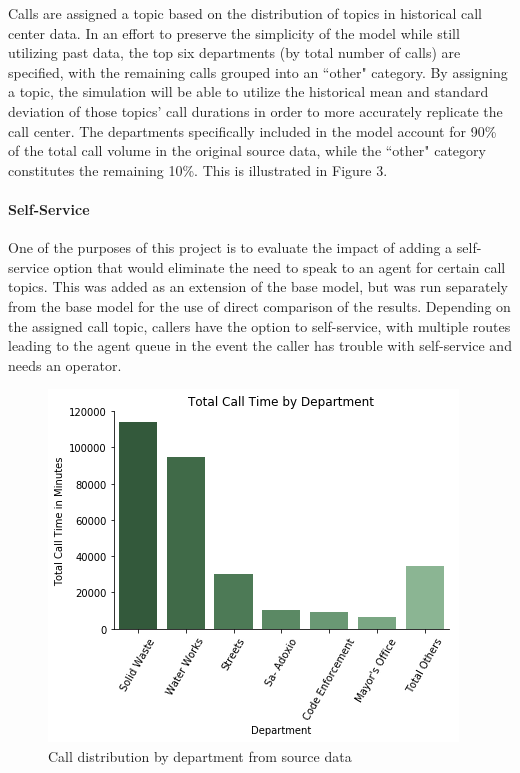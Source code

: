 \documentclass[12pt,twocolumn]{article}
\begin{document}
Calls are assigned a topic based on the distribution of topics in historical call center data.  In an effort to preserve the simplicity of the model while still utilizing past data, the top six departments (by total number of calls) are specified, with the remaining calls grouped into an ``other" category.  By assigning a topic, the simulation will be able to utilize the historical mean and standard deviation of those topics' call durations in order to more accurately replicate the call center.  The departments specifically included in the model account for 90\% of the total call volume in the original source data, while the ``other" category constitutes the remaining 10\%.  This is illustrated in Figure 3.

	\paragraph{Self-Service}
	
One of the purposes of this project is to evaluate the impact of adding a self-service option that would eliminate the need to speak to an agent for certain call topics.  This was added as an extension of the base model, but was run separately from the base model for the use of direct comparison of the results.  Depending on the assigned call topic, callers have the option to self-service, with multiple routes leading to the agent queue in the event the caller has trouble with self-service and needs an operator.


\begin{figure}[h]
	\includegraphics[scale=.53]{Calls_Department_sim.png}
	\caption{Call distribution by department from source data}
\end{figure}
\end{document}
